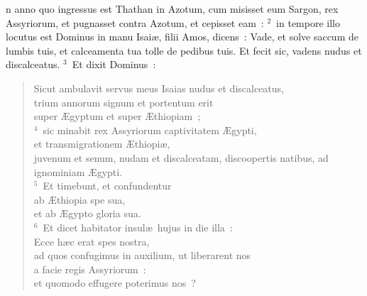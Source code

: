 \bchapter
{}n anno quo ingressus est Thathan in Azotum, cum misisset eum Sargon, rex Assyriorum, et pugnasset contra Azotum, et cepisset eam~:
${}^{2}$~in tempore illo locutus est Dominus in manu Isai\ae , filii Amos, dicens~: Vade, et solve saccum de lumbis tuis, et calceamenta tua tolle de pedibus tuis. Et fecit sic, vadens nudus et discalceatus.
${}^{3}$~Et dixit Dominus~: \begin{verse}Sicut ambulavit servus meus Isaias nudus et discalceatus,\\ trium annorum signum et portentum erit\\ super \AE gyptum et super \AE thiopiam~;\\
${}^{4}$~sic minabit rex Assyriorum captivitatem \AE gypti,\\ et transmigrationem \AE thiopi\ae ,\\ juvenum et senum, nudam et discalceatam, discoopertis natibus, ad ignominiam \AE gypti.\\
${}^{5}$~Et timebunt, et confundentur\\ ab \AE thiopia spe sua,\\ et ab \AE gypto gloria sua.\\
${}^{6}$~Et dicet habitator insul\ae\ hujus in die illa~:\\ Ecce h\ae c erat spes nostra,\\ ad quos confugimus in auxilium, ut liberarent nos\\ a facie regis Assyriorum~:\\ et quomodo effugere poterimus nos~?\end{verse}



